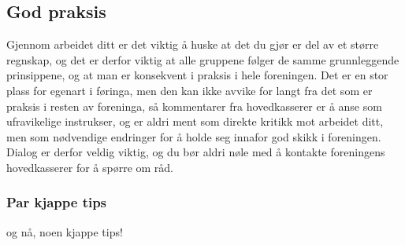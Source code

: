\subsection{God praksis}
Gjennom arbeidet ditt er det viktig å huske at det du gjør er del av et større regnskap, og det er derfor viktig at alle gruppene følger de samme grunnleggende prinsippene, og at man er konsekvent i praksis i hele foreningen. Det er en stor plass for egenart i føringa, men den kan ikke avvike for langt fra det som er praksis i resten av foreninga, så kommentarer fra hovedkasserer er å anse som ufravikelige instrukser, og er aldri ment som direkte kritikk mot arbeidet ditt, men som nødvendige endringer for å holde seg innafor god skikk i foreningen. Dialog er derfor veldig viktig, og du bør aldri nøle med å kontakte foreningens hovedkasserer for å spørre om råd.

\subsubsection*{Par kjappe tips}
og nå, noen kjappe tips!

